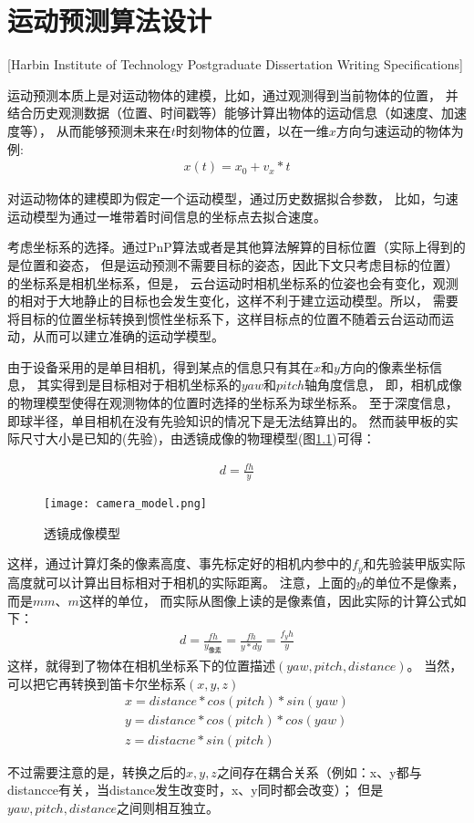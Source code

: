 

\chapter[运动预测算法设计]{运动预测算法设计}[Harbin Institute of Technology Postgraduate Dissertation Writing Specifications]

运动预测本质上是对运动物体的建模，比如，通过观测得到当前物体的位置，
并结合历史观测数据（位置、时间戳等）能够计算出物体的运动信息（如速度、加速度等），
从而能够预测未来在$t$时刻物体的位置，以在一维$x$方向匀速运动的物体为例: 
\begin{gather}
    x(t) = x_0 + v_x*t
\end{gather}

对运动物体的建模即为假定一个运动模型，通过历史数据拟合参数，
比如，匀速运动模型为通过一堆带着时间信息的坐标点去拟合速度。\par

考虑坐标系的选择。通过PnP\cite{wu2006pnp}算法或者是其他算法解算的目标位置（实际上得到的是位置和姿态，
但是运动预测不需要目标的姿态，因此下文只考虑目标的位置）的坐标系是相机坐标系，但是，
云台运动时相机坐标系的位姿也会有变化，观测的相对于大地静止的目标也会发生变化，这样不利于建立运动模型。所以，
需要将目标的位置坐标转换到惯性坐标系下，这样目标点的位置不随着云台运动而运动，从而可以建立准确的运动学模型。\par
由于设备采用的是单目相机，得到某点的信息只有其在$x$和$y$方向的像素坐标信息，
其实得到是目标相对于相机坐标系的$yaw$和$pitch$轴角度信息，
即，相机成像的物理模型使得在观测物体的位置时选择的坐标系为球坐标系。
至于深度信息，即球半径，单目相机在没有先验知识的情况下是无法结算出的。
然而装甲板的实际尺寸大小是已知的(先验)，由透镜成像的物理模型(图\ref{透镜成像模型})可得：\par
\begin{gather}
    d = \frac{fh}{y} 
\end{gather}

\begin{figure}[H]
    \centering
    \texttt{[image: camera\_model.png]} 
    \caption{透镜成像模型}
    \label{透镜成像模型} 
\end{figure}    
这样，通过计算灯条的像素高度、事先标定好的相机内参中的$f_y$和先验装甲版实际高度就可以计算出目标相对于相机的实际距离。
注意，上面的$y$的单位不是像素，而是$mm$、$m$这样的单位，
而实际从图像上读的是像素值，因此实际的计算公式如下：
\begin{gather}
    d=\frac{fh}{y_{像素}}=\frac{fh}{y*dy}=\frac{f_yh}{y}
\end{gather}
这样，就得到了物体在相机坐标系下的位置描述$(yaw,pitch, distance)$。
当然，可以把它再转换到笛卡尔坐标系$(x,y,z)$
\begin{gather}
    x = distance*cos(pitch)*sin(yaw) \\
    y = distance*cos(pitch)*cos(yaw) \\
    z = distacne * sin(pitch)
\end{gather} \par
不过需要注意的是，转换之后的$x,y,z$之间存在耦合关系（例如：x、y都与distancce有关，当distance发生改变时，x、y同时都会改变）；
但是$yaw,pitch,distance$之间则相互独立。\par

